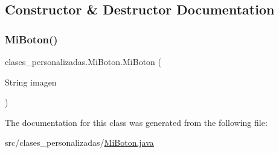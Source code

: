 \subsection{Constructor \& Destructor Documentation}
\mbox{\label{classclases__personalizadas_1_1_mi_boton_a3ab6fe888b31aed137d01b7275f4eca6}} 
\subsubsection{\texorpdfstring{Mi\+Boton()}{MiBoton()}}
{\footnotesize\ttfamily clases\+\_\+personalizadas.\+Mi\+Boton.\+Mi\+Boton (\begin{DoxyParamCaption}\item[{String}]{imagen }\end{DoxyParamCaption})}



The documentation for this class was generated from the following file\+:\begin{DoxyCompactItemize}
\item 
src/clases\+\_\+personalizadas/\mbox{\hyperlink{_mi_boton_8java}{Mi\+Boton.\+java}}\end{DoxyCompactItemize}

